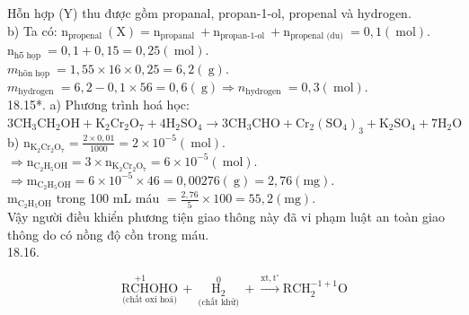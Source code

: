 \documentclass[10pt]{article}
\begin{document}
Hỗn hợp (Y) thu được gồm propanal, propan-1-ol, propenal và hydrogen.\\
b) Ta có: $\mathrm{n}_{\text {propenal }}(\mathrm{X})=\mathrm{n}_{\text {propanal }}+\mathrm{n}_{\text {propan-1-ol }}+\mathrm{n}_{\text {propenal (du) }}=0,1(\mathrm{~mol})$.\\
$\mathrm{n}_{\text {hŏ̃ họp }}=0,1+0,15=0,25(\mathrm{~mol})$.\\
$m_{\text {hõn họp }}=1,55 \times 16 \times 0,25=6,2(\mathrm{~g})$.\\
$m_{\text {hydrogen }}=6,2-0,1 \times 56=0,6(\mathrm{~g}) \Rightarrow n_{\text {hydrogen }}=0,3(\mathrm{~mol})$.\\
18.15*. a) Phương trình hoá học:\\
$3 \mathrm{CH}_{3} \mathrm{CH}_{2} \mathrm{OH}+\mathrm{K}_{2} \mathrm{Cr}_{2} \mathrm{O}_{7}+4 \mathrm{H}_{2} \mathrm{SO}_{4} \rightarrow 3 \mathrm{CH}_{3} \mathrm{CHO}+\mathrm{Cr}_{2}\left(\mathrm{SO}_{4}\right)_{3}+\mathrm{K}_{2} \mathrm{SO}_{4}+7 \mathrm{H}_{2} \mathrm{O}$\\
b) $\mathrm{n}_{\mathrm{K}_{2} \mathrm{Cr}_{2} \mathrm{O}_{7}}=\frac{2 \times 0,01}{1000}=2 \times 10^{-5}(\mathrm{~mol})$.\\
$\Rightarrow \mathrm{n}_{\mathrm{C}_{2} \mathrm{H}_{5} \mathrm{OH}}=3 \times \mathrm{n}_{\mathrm{K}_{2} \mathrm{Cr}_{2} \mathrm{O}_{7}}=6 \times 10^{-5}(\mathrm{~mol})$.\\
$\Rightarrow \mathrm{m}_{\mathrm{C}_{2} \mathrm{H}_{5} \mathrm{OH}}=6 \times 10^{-5} \times 46=0,00276(\mathrm{~g})=2,76(\mathrm{mg})$.\\
$\mathrm{m}_{\mathrm{C}_{2} \mathrm{H}_{5} \mathrm{OH}}$ trong 100 mL máu $=\frac{2,76}{5} \times 100=55,2(\mathrm{mg})$.\\
Vậy người điều khiển phương tiện giao thông này đã vi phạm luật an toàn giao thông do có nồng độ cồn trong máu.\\
18.16.

$$
\underset{\text { (chất oxi hoá) }}{\stackrel{+1}{\mathrm{RCHO}} \mathrm{HO}}+\underset{\text { (chất khử) }}{\stackrel{0}{\mathrm{H}_{2}}}+\stackrel{\mathrm{xt}, \mathrm{t}^{\circ}}{\longrightarrow} \mathrm{RCH}_{2}^{-1+1} \mathrm{O}
$$
\end{document}
